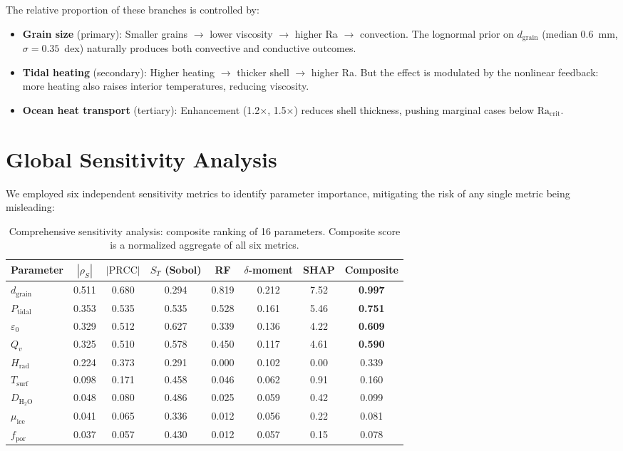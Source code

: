 \documentclass[11pt,letterpaper]{article}
\begin{document}
The relative proportion of these branches is controlled by:
\begin{itemize}[nosep]
  \item \textbf{Grain size} (primary): Smaller grains $\rightarrow$ lower viscosity $\rightarrow$ higher Ra $\rightarrow$ convection. The lognormal prior on $d_\mathrm{grain}$ (median 0.6~mm, $\sigma = 0.35$~dex) naturally produces both convective and conductive outcomes.
  \item \textbf{Tidal heating} (secondary): Higher heating $\rightarrow$ thicker shell $\rightarrow$ higher Ra. But the effect is modulated by the nonlinear feedback: more heating also raises interior temperatures, reducing viscosity.
  \item \textbf{Ocean heat transport} (tertiary): Enhancement (1.2$\times$, 1.5$\times$) reduces shell thickness, pushing marginal cases below $\mathrm{Ra_{crit}}$.
\end{itemize}


\section{Global Sensitivity Analysis}
\label{sec:sensitivity}

We employed six independent sensitivity metrics to identify parameter importance, mitigating the risk of any single metric being misleading:

\begin{table}[htbp]
\centering
\caption{Comprehensive sensitivity analysis: composite ranking of 16 parameters. Composite score is a normalized aggregate of all six metrics.}
\label{tab:sensitivity}
\small
\begin{tabular}{@{}lccccccc@{}}
\toprule
\textbf{Parameter} & \textbf{$|\rho_S|$} & \textbf{$|\mathrm{PRCC}|$} & \textbf{$S_T$ (Sobol)} & \textbf{RF} & \textbf{$\delta$-moment} & \textbf{SHAP} & \textbf{Composite} \\
\midrule
$d_\mathrm{grain}$ & 0.511 & 0.680 & 0.294 & 0.819 & 0.212 & 7.52 & \textbf{0.997} \\
$P_\mathrm{tidal}$ & 0.353 & 0.535 & 0.535 & 0.528 & 0.161 & 5.46 & \textbf{0.751} \\
$\varepsilon_0$ & 0.329 & 0.512 & 0.627 & 0.339 & 0.136 & 4.22 & \textbf{0.609} \\
$Q_v$ & 0.325 & 0.510 & 0.578 & 0.450 & 0.117 & 4.61 & \textbf{0.590} \\
$H_\mathrm{rad}$ & 0.224 & 0.373 & 0.291 & 0.000 & 0.102 & 0.00 & 0.339 \\
$T_\mathrm{surf}$ & 0.098 & 0.171 & 0.458 & 0.046 & 0.062 & 0.91 & 0.160 \\
$D_\mathrm{H_2O}$ & 0.048 & 0.080 & 0.486 & 0.025 & 0.059 & 0.42 & 0.099 \\
$\mu_\mathrm{ice}$ & 0.041 & 0.065 & 0.336 & 0.012 & 0.056 & 0.22 & 0.081 \\
$f_\mathrm{por}$ & 0.037 & 0.057 & 0.430 & 0.012 & 0.057 & 0.15 & 0.078 \\
\bottomrule
\end{tabular}
\end{table}
\end{document}
